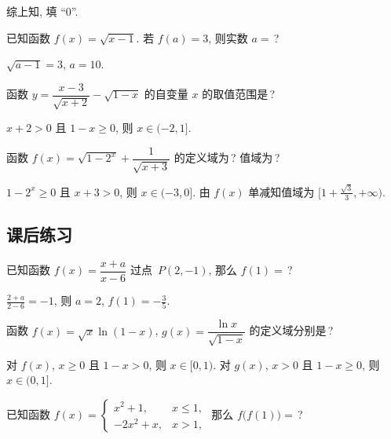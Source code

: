     综上知, 填 ``$0$''.
  \endsolution
  
  \begin{exercise}
    已知函数 $f(x)=\sqrt{x-1}$. 若 $f(a)=3$, 则实数 $a=$\,?
  \end{exercise}

  \beginsolution
    $\sqrt{a-1}=3$, $a=10$.
  \endsolution
  
  \begin{exercise}
    函数 $y=\dfrac{x-3}{\sqrt{x+2}}-\sqrt{1-x}$ 的自变量 $x$ 的取值范围是\,?
  \end{exercise}

  \beginsolution
    $x+2>0$ 且 $1-x\geqslant 0$, 则 $x\in(-2,1]$.
  \endsolution
  
  \begin{exercise}
    函数 $f(x)= \sqrt{1-2^x}+ \dfrac1{\sqrt{x+3}}$ 的定义域为\,? 值域为\,?
  \end{exercise}

  \beginsolution
    $1-2^x\geqslant 0$ 且 $x+3>0$, 则 $x\in(-3,0]$. 由 $f(x)$ 单减知值域为 $\Big[1+\frac{\sqrt3}3,+\infty\Big)$.
  \endsolution
  
  \subsection{课后练习}
  
  \begin{exercise}
    已知函数 $f(x)=\dfrac{x+a}{x-6}$ 过点~$P(2,-1)$, 那么 $f(1)=$\,?
  \end{exercise}

  \beginsolution
    $\frac{2+a}{2-6}=-1$, 则 $a=2$, $f(1)=-\frac35$.
  \endsolution
  
  \begin{exercise}
    函数 $f(x)= \sqrt{x} \ln(1-x)$, $g(x)= \dfrac{\ln x}{\sqrt{1-x}}$ 的定义域分别是\,?
  \end{exercise}

  \beginsolution
    对 $f(x)$, $x\geqslant 0$ 且 $1-x>0$, 则 $x\in[0,1)$. 
    对 $g(x)$, $x>0$ 且 $1-x\geqslant0$, 则 $x\in(0,1]$.
  \endsolution
  
  \begin{exercise}
    已知函数 $f(x)=\begin{cases}
      x^2+1, & x\leqslant 1,\\
      -2x^2+x, & x>1,
      \end{cases}$ 那么 $f\big(f(1)\big)=$\,?
  \end{exercise}

